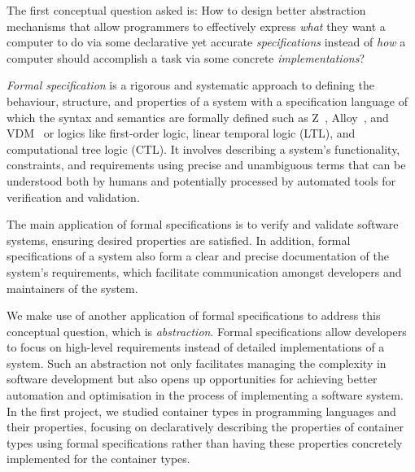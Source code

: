 
\begin{center}
\vspace{-0.7em}
\vspace{-0.3em}
\end{center}

The first conceptual question asked is: 
How to design better abstraction mechanisms that allow programmers to effectively express \emph{what} they want a computer to do via some declarative yet accurate \emph{specifications} instead of \emph{how} a computer should accomplish a task via some concrete \emph{implementations}?

\emph{Formal specification} is a rigorous and systematic approach to defining the behaviour, structure, and properties of a system with a specification language of which the syntax and semantics are formally defined such as Z~\citep{znotation}, Alloy~\citep{alloy}, and VDM~\citep{vdm} or logics like first-order logic, linear temporal logic (LTL), and computational tree logic (CTL). It involves describing a system's functionality, constraints, and requirements using precise and unambiguous terms that can be understood both by humans and potentially processed by automated tools for verification and validation.

The main application of formal specifications is to verify and validate software systems, ensuring desired properties are satisfied. In addition, formal specifications of a system also form a clear and precise documentation of the system's requirements, which facilitate communication amongst developers and maintainers of the system.

We make use of another application of formal specifications to address this conceptual question, which is \emph{abstraction}. Formal specifications allow developers to focus on high-level requirements instead of detailed implementations of a system. Such an abstraction not only facilitates managing the complexity in software development but also opens up opportunities for achieving better automation and optimisation in the process of implementing a software system. In the first project, we studied container types in programming languages and their properties, focusing on declaratively describing the properties of container types using formal specifications rather than having these properties concretely implemented for the container types.

